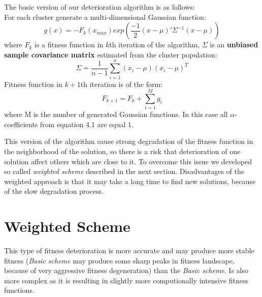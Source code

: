 The basic version of our deterioration algorithm is as follows: \\
For each cluster generate a multi-dimensional Gaussian function:
\begin{equation}
 g(x)= - F_k(x_{max}) exp(\frac{-1}{2}(x-\mu)'\Sigma^{-1}(x - \mu))
\end{equation}
where $F_k$ is a fitness function in $k$th iteration of the algorithm,
$\Sigma$ is an \textbf{unbiased sample covariance matrix} \cite{covariance}
estimated from the cluster population:
\begin{equation}
 \Sigma = \frac{1}{n-1}\sum_{i=1}^n(x_i - \mu)(x_i - \mu)^T
\end{equation}
Fitness function in $k+1$th iteration is of the form:
\begin{equation}
 F_{k+1}=F_k + \sum_{i=1}^M g_i
\end{equation}
where M is the number of generated Gaussian functions. In this case all
$\alpha$-coefficients from equation 4.1 are equal $1$.

This version of the algorithm cause strong degradation of the fitness function
in the neighborhood of the solution, so there is a risk that deterioration of
one solution affect others which are close to it. To overcome this issue we
developed so called \textit{weighted scheme} described in the next section.
Disadvantages of the weighted approach is that it may take a long time
to find new solutions, because of the slow degradation process. 

\section{Weighted Scheme}

This type of fitness deterioration is more accurate and may produce more 
stable fitness (\textit{Basic scheme} may produce some sharp peaks in 
fitness landscape, because of very aggressive fitness degeneration) than the 
\textit{Basic scheme}. Is also more complex as it is resulting in
slightly more computionally intensive fitness functions.

